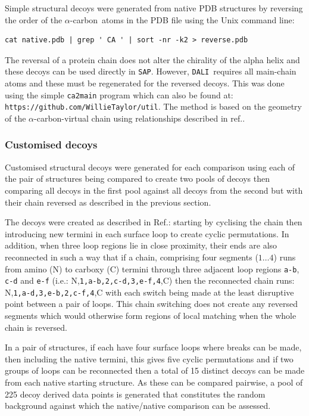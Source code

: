 \documentclass{bmcart}
\newcommand{\CA}{$\alpha$-carbon}
\newcommand{\SAP}{{\tt SAP}}
\newcommand{\DALI}{{\tt DALI}}
\begin{document}
Simple structural decoys were generated from native PDB structures by reversing the order
of the \CA\ atoms in the PDB file using the Unix command line:
\begin{verbatim}
cat native.pdb | grep ' CA ' | sort -nr -k2 > reverse.pdb
\end{verbatim}
The reversal of a protein chain does not alter the chirality of the alpha helix and
these decoys can be used directly in \SAP.   However, \DALI\ requires all main-chain atoms
and these must be regenerated for the reversed decoys.   This was done using the simple
{\tt ca2main} program which can also be found at: {\tt https://github.com/WillieTaylor/util}.
The method is based on the geometry of the \CA-virtual chain using relationships described
in ref.\cite{LevittMet77}.

\subsubsection*{Customised decoys}

Customised structural decoys were generated for each comparison using each of the
pair of structures being compared to create two pools of decoys then comparing all
decoys in the first pool against all decoys from the second but with their chain
reversed as described in the previous section.

The decoys were created as described in Ref.\cite{TaylorWR06a}: starting by cyclising the
chain then introducing new termini in each surface loop to create cyclic permutations.
In addition, when three loop regions lie in close proximity, their ends are also
reconnected in such a way that if a chain, comprising four segments ($1\ldots4$) runs 
from amino (N) to carboxy (C) termini through three adjacent loop regions {\tt a-b},
{\tt c-d} and {\tt e-f} (i.e.: N,{\tt 1,a-b,2,c-d,3,e-f,4},C) then the reconnected chain
runs: N,{\tt 1,a-d,3,e-b,2,c-f,4},C with each switch being made at the least disruptive
point between a pair of loops.   This chain switching does not create any reversed segments
which would otherwise form regions of local matching when the whole chain is reversed.

In a pair of structures, if each have four surface loops where breaks can be made, then
including the native termini, this gives five cyclic permutations and if two groups of
loops can be reconnected then a total of 15 distinct decoys can be made from each native
starting structure.   As these can be compared pairwise, a pool of 225 decoy derived
data points is generated that constitutes the random background against which the native/native
comparison can be assessed.
\end{document}
